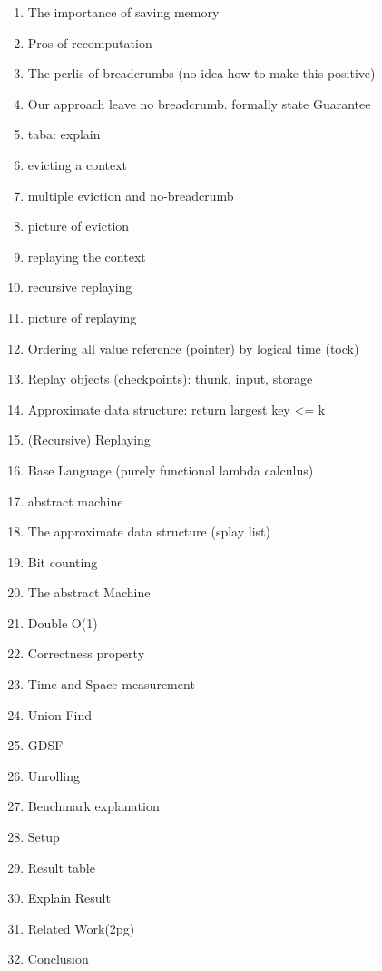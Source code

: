 \documentclass[acmsmall]{acmart}
\begin{document}
	\begin{enumerate}
		\item The importance of saving memory
		\item Pros of recomputation
		\item The perlis of breadcrumbs (no idea how to make this positive)
		\item Our approach leave no breadcrumb. formally state Guarantee
		\item taba: explain
		\item evicting a context
		\item multiple eviction and no-breadcrumb
		\item picture of eviction
		\item replaying the context
		\item recursive replaying
		\item picture of replaying
		\item Ordering all value reference (pointer) by logical time (tock)
		\item Replay objects (checkpoints): thunk, input, storage
		\item Approximate data structure: return largest key <= k
		\item (Recursive) Replaying
		\item Base Language (purely functional lambda calculus)
		\item abstract machine
		\item The approximate data structure (splay list)
		\item Bit counting
		\item The abstract Machine
		\item Double O(1)
		\item Correctness property
		\item Time and Space measurement
		\item Union Find
		\item GDSF
		\item Unrolling
		\item Benchmark explanation
		\item Setup
		\item Result table
		\item Explain Result
		\item Related Work(2pg)
		\item Conclusion
	\end{enumerate}
	
\end{document}
